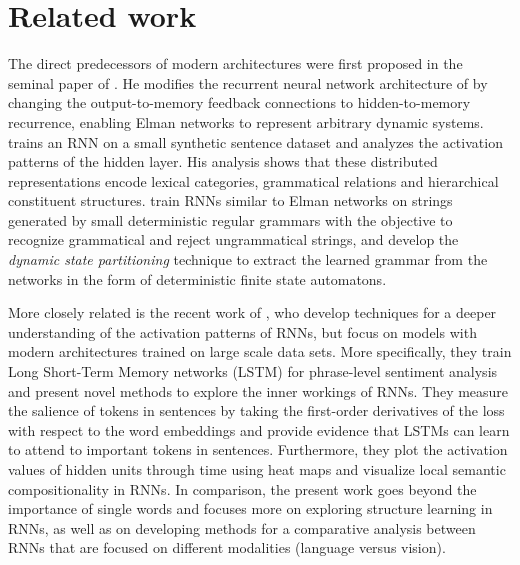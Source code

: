 \section{Related work}
\label{sec:related}

The direct predecessors of modern architectures were first proposed in the 
seminal paper of . He modifies the recurrent 
neural network architecture of  by changing the output-to-memory 
feedback connections to hidden-to-memory recurrence, enabling Elman networks to 
represent arbitrary dynamic systems.  trains an RNN on a small synthetic
sentence  dataset and analyzes the activation patterns of the hidden
layer. His analysis shows that these distributed representations  
encode lexical categories, grammatical relations and hierarchical constituent 
structures.  train RNNs similar to Elman
networks on strings generated by small 
deterministic regular grammars with the objective to recognize grammatical and reject ungrammatical 
strings, and develop the \emph{dynamic state partitioning} technique to extract the learned 
grammar from the networks in the form of deterministic finite state
automatons.


More closely related is the recent work of , who develop techniques 
for a deeper understanding of the activation patterns of RNNs, but focus on models with 
modern architectures trained on large scale data sets. More specifically, they train Long 
Short-Term Memory networks (LSTM) \cite{hochreiter1997long} 
for phrase-level sentiment analysis 
and present novel methods 
to explore the inner workings of RNNs. They measure the salience of tokens
in sentences by taking the first-order derivatives of the loss with respect to the
word embeddings and provide evidence 
that LSTMs can learn to attend to important tokens in sentences. Furthermore,
they plot the activation values of hidden units through time using heat maps 
and visualize local semantic compositionality in RNNs. 
In comparison, the present work goes beyond the importance of single words and focuses more on exploring structure 
learning in RNNs, as well as on developing methods for a comparative analysis between RNNs that are focused on different modalities (language versus vision).

